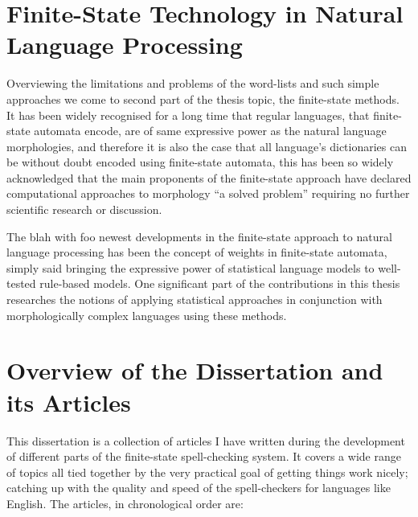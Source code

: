 \documentclass[officiallayout]{unihelcompling}
\begin{document}
\section{Finite-State Technology in Natural Language Processing}
\label{sec:finite-state-technology-in-nlp}

Overviewing the limitations and problems of the word-lists and such simple
approaches we come to second part of the thesis topic, the finite-state methods.
It has been widely recognised for a long time that regular languages, that
finite-state automata encode, are of same expressive power as the natural
language morphologies, and therefore it is also the case that all language's
dictionaries can be without doubt encoded using finite-state automata, this has
been so widely acknowledged that the main proponents of the finite-state
approach have declared computational approaches to morphology ``a solved
problem'' requiring no further scientific research or discussion.

The blah with foo newest developments in the finite-state approach to natural
language processing has been the concept of weights in finite-state automata,
simply said bringing the expressive power of statistical language models to
well-tested rule-based models. One significant part of the contributions in
this thesis researches the notions of applying statistical approaches in
conjunction with morphologically complex languages using these 
methods.

\section{Overview of the Dissertation and its Articles}
\label{sec:articles}

This dissertation is a collection of articles I have written during the
development of different parts of the finite-state spell-checking system. It
covers a wide range of topics all tied together by the very practical goal of
getting things work nicely; catching up with the quality and speed of the
spell-checkers for languages like English. The articles, in chronological order
are:
\end{document}
